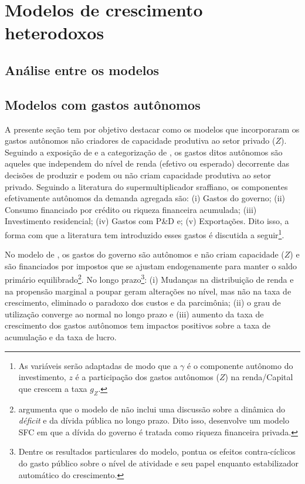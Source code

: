 \section{Modelos de crescimento heterodoxos}

\subsection{Análise entre os modelos}


\subsection{Modelos com gastos autônomos}

A presente seção tem por objetivo destacar como os modelos que incorporaram os gastos autônomos não criadores de capacidade produtiva ao setor privado ($Z$). Seguindo a exposição de \textcite{cesaratto_technical_2003} e a categorização de \textcite{serrano_sraffian_1995}, os gastos ditos autônomos são aqueles que independem do nível de renda (efetivo ou esperado) decorrente das decisões de produzir e podem ou não criam capacidade produtiva ao setor privado. Seguindo a literatura do supermultiplicador sraffiano, os componentes efetivamente autônomos da demanda agregada são: (i) Gastos do governo; (ii) Consumo financiado por crédito ou riqueza financeira acumulada; (iii) Investimento residencial; (iv) Gastos com P\&D e; (v) Exportações. Dito isso, a forma com que a literatura tem introduzido esses gastos é discutida a seguir\footnote{As variáveis serão adaptadas de modo que a $\gamma$ é o componente autônomo do investimento,  $z$ é a participação dos gastos autônomos ($Z$) na renda/Capital que crescem a taxa $g_Z$.}.

No modelo de \textcite{allain_macroeconomic_2014}, os gastos do governo são autônomos e não criam capacidade ($Z$) e são financiados por impostos que se ajustam endogenamente para manter o saldo primário equilibrado\footnote{
\textcite{hein_autonomous_2018} argumenta que o modelo de \textcite{allain_macroeconomic_2014} não inclui uma discussão sobre a dinâmica do \textit{déficit} e da dívida pública no longo prazo. Dito isso, desenvolve um modelo SFC em que a dívida do governo é tratada como riqueza financeira privada.
}. No longo prazo\footnote{Dentre os resultados particulares do modelo, \textcite{allain_macroeconomic_2014} pontua os efeitos contra-cíclicos do gasto público sobre o nível de atividade e seu papel enquanto estabilizador automático do crescimento.}: (i) Mudanças na distribuição de renda e na propensão marginal a poupar geram alterações no nível, mas não na taxa de crescimento, eliminado o paradoxo dos custos e da parcimônia; (ii) o grau de utilização converge ao normal no longo prazo e (iii) aumento da taxa de crescimento dos gastos autônomos tem impactos positivos sobre a taxa de acumulação e da taxa de lucro.


